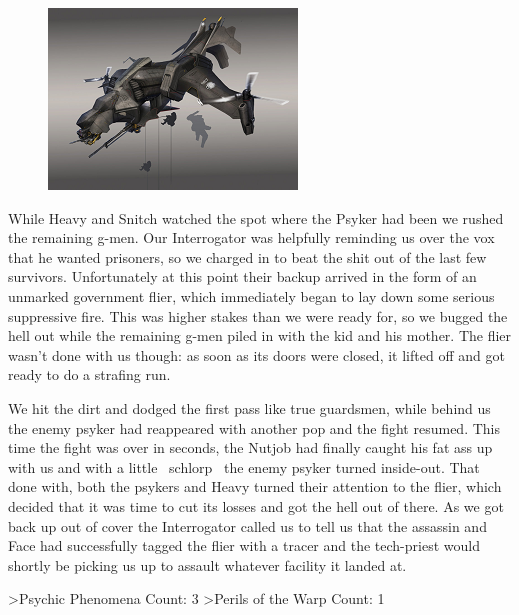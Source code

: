 \begin{figure}
\begin{center}
	\includegraphics[width=\figwidth]{pics/3/14.png}
\end{center}
\end{figure}
While Heavy and Snitch watched the spot where the Psyker had been we rushed the remaining g-men. 
Our Interrogator was helpfully reminding us over the vox that he wanted prisoners, so we charged in to beat the shit out of the last few survivors. 
Unfortunately at this point their backup arrived in the form of an unmarked government flier, which immediately began to lay down some serious suppressive fire. 
This was higher stakes than we were ready for, so we bugged the hell out while the remaining g-men piled in with the kid and his mother. 
The flier wasn’t done with us though: as soon as its doors were closed, it lifted off and got ready to do a strafing run.

We hit the dirt and dodged the first pass like true guardsmen, while behind us the enemy psyker had reappeared with another pop and the fight resumed.
This time the fight was over in seconds, the Nutjob had finally caught his fat ass up with us and with a little ~schlorp~ the enemy psyker turned inside-out.
That done with, both the psykers and Heavy turned their attention to the flier, which decided that it was time to cut its losses and got the hell out of there. 
As we got back up out of cover the Interrogator called us to tell us that the assassin and Face had successfully tagged the flier with a tracer and the tech-priest would shortly be picking us up to assault whatever facility it landed at.

>Psychic Phenomena Count: 3
>Perils of the Warp Count: 1

